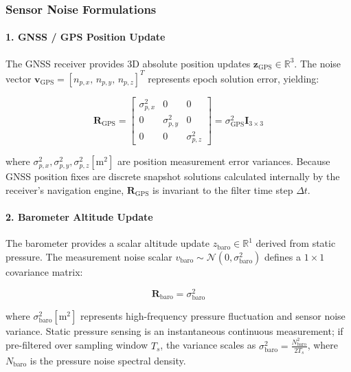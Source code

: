 \documentclass{article}
\begin{document}
	\subsubsection{Sensor Noise Formulations}
	
	\paragraph{1. GNSS / GPS Position Update}
	The GNSS receiver provides 3D absolute position updates $\mathbf{z}_{\text{GPS}} \in \mathbb{R}^3$. The noise vector $\mathbf{v}_{\text{GPS}} = [n_{p,x}, \, n_{p,y}, \, n_{p,z}]^T$ represents epoch solution error, yielding:
	
	\begin{equation}
		\mathbf{R}_{\text{GPS}} = \begin{bmatrix}
			\sigma_{p,x}^2 & 0 & 0 \\
			0 & \sigma_{p,y}^2 & 0 \\
			0 & 0 & \sigma_{p,z}^2
		\end{bmatrix} = \sigma_{\text{GPS}}^2 \mathbf{I}_{3 \times 3}
	\end{equation}
	
	where $\sigma_{p,x}^2, \sigma_{p,y}^2, \sigma_{p,z}^2 \left[\text{m}^2\right]$ are position measurement error variances. Because GNSS position fixes are discrete snapshot solutions calculated internally by the receiver's navigation engine, $\mathbf{R}_{\text{GPS}}$ is invariant to the filter time step $\Delta t$.
	
	\paragraph{2. Barometer Altitude Update}
	The barometer provides a scalar altitude update $z_{\text{baro}} \in \mathbb{R}^1$ derived from static pressure. The measurement noise scalar $v_{\text{baro}} \sim \mathcal{N}(0, \sigma_{\text{baro}}^2)$ defines a $1 \times 1$ covariance matrix:
	
	\begin{equation}
		\mathbf{R}_{\text{baro}} = \sigma_{\text{baro}}^2
	\end{equation}
	
	where $\sigma_{\text{baro}}^2 \left[\text{m}^2\right]$ represents high-frequency pressure fluctuation and sensor noise variance. Static pressure sensing is an instantaneous continuous measurement; if pre-filtered over sampling window $T_s$, the variance scales as $\sigma_{\text{baro}}^2 = \frac{N_{\text{baro}}^2}{2 T_s}$, where $N_{\text{baro}}$ is the pressure noise spectral density.
	
\end{document}
